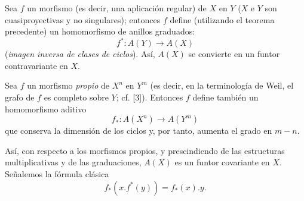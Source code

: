 Sea $f$ un morfismo (es decir, una aplicación regular) de $X$ en $Y$ ($X$ e $Y$ son cuasiproyectivas y no singulares); entonces $f$ define (utilizando el teorema precedente) un homomorfismo de anillos graduados:
\begin{equation}\tag{2.1}
f^*:A(Y)\longrightarrow A(X)
\end{equation}
(\emph{imagen inversa de clases de ciclos}). Así, $A(X)$ se convierte en un funtor contravariante en $X$.

Sea $f$ un morfismo \emph{propio} de $X^n$ en $Y^m$ (es decir, en la terminología de Weil, el grafo de $f$ es completo sobre $Y$; cf. [3]). Entonces $f$ define también un homomorfismo aditivo
\begin{equation}\tag{2.2}
f_*:A(X^n)\longrightarrow A(Y^m)
\end{equation}
que conserva la dimensión de los ciclos y, por tanto, aumenta el grado en $m-n$.




Así, con respecto a los morfismos propios, y prescindiendo de las estructuras multiplicativas y de las graduaciones, $A(X)$ es un funtor covariante en $X$. Señalemos la fórmula clásica
\begin{equation}\tag{2.3}
 f_*(x.f^*(y))=f_*(x).y .
\end{equation}

